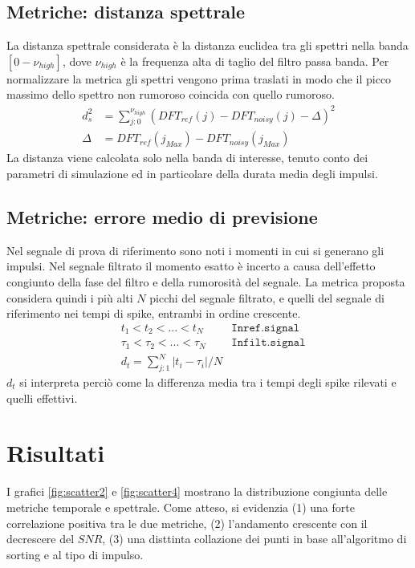 \documentclass[9pt,twocolumn,twoside]{osajnl}
\begin{document}
\subsection{Metriche: distanza spettrale}
\label{metricaS}

La distanza spettrale considerata è la distanza euclidea tra gli spettri nella banda $[0-\nu_{high}]$, dove $\nu_{high}$ è la frequenza alta di taglio del filtro passa banda. Per normalizzare la metrica gli spettri vengono prima traslati in modo che il picco massimo dello spettro non rumoroso coincida con quello rumoroso.
%
\begin{align*}
 d_{s}^2 & = \sum_{j:0}^{\nu_{high}}(DFT_{ref}(j) - DFT_{noisy}(j) - \Delta)^2 \\
 \Delta  & = DFT_{ref}(j_{Max}) - DFT_{noisy}(j_{Max})
\end{align*}
%
La distanza viene calcolata solo nella banda di interesse, tenuto conto dei parametri di simulazione ed in particolare della durata media degli impulsi.



\subsection{Metriche: errore medio di previsione}
\label{metricaT}

Nel segnale di prova di riferimento sono noti i momenti in cui si generano gli impulsi.
Nel segnale filtrato il momento esatto è incerto a causa dell'effetto congiunto della fase del filtro e della rumorosità del segnale. La metrica proposta considera quindi i più alti $N$ picchi del segnale filtrato, e quelli del segnale di riferimento nei tempi di spike, entrambi in ordine crescente.
%
\begin{align*}
 & t_{1} < t_{2} < ... < t_{N} & \mathtt{In ref. signal}\\
 & \tau_{1} < \tau_{2} < ... < \tau_{N} & \mathtt{In filt. signal}\\
 & d_{t} = \sum_{j:1}^{N} |t_{i} - \tau_{i}| / N
 \end{align*}
%
$d_{t}$ si interpreta perciò come la differenza media tra i tempi degli spike rilevati e quelli effettivi. 




\section{Risultati}
\label{risultati}

I grafici \ref{fig:scatter2} e \ref{fig:scatter4} mostrano la distribuzione congiunta delle metriche temporale e spettrale. Come atteso, si evidenzia (1) una forte correlazione positiva tra le due metriche, (2) l'andamento crescente con il decrescere del $SNR$, (3) una disttinta collazione dei punti in base all'algoritmo di sorting e al tipo di impulso.
\end{document}
